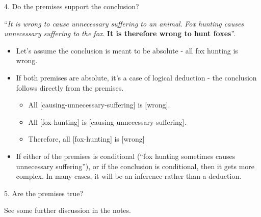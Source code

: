 \documentclass{beamer}
\begin{document}
\begin{frame}{4. Do the premises support the conclusion?}

``\emph{It is wrong to cause unnecessary suffering to an animal}. \emph{Fox hunting causes unnecessary suffering to the fox}. \textbf{It is therefore wrong to hunt foxes}''.

\begin{itemize}
	\item Let's assume the conclusion is meant to be absolute - all fox hunting is wrong.
	\item If both premises are absolute, it's a case of logical deduction - the conclusion follows directly from the premises.
	\begin{itemize}
		\item All [causing-unnecessary-suffering] is [wrong].
		\item All [fox-hunting] is [causing-unnecessary-suffering].
		\item Therefore, all [fox-hunting] is [wrong]
	\end{itemize}
	\item If either of the premises is conditional (``fox hunting sometimes causes unnecessary suffering''), or if the conclusion is conditional, then it gets more complex. In many cases, it will be an inference rather than a deduction. 
\end{itemize}
\end{frame}

\begin{frame}{5. Are the premises true?}

See some further discussion in the notes.
	
\end{frame}





\end{document}

